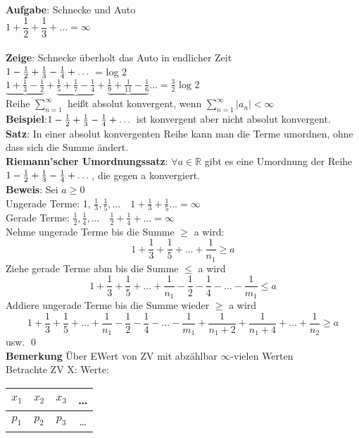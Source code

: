 \textbf{Aufgabe}: Schnecke und Auto\\
$1+\dfrac{1}{2}+\dfrac{1}{3}+\dots = \infty$\medskip\\
\\
\textbf{Zeige}: Schnecke überholt das Auto in endlicher Zeit\\
$1-\frac{1}{2}+\frac{1}{3} - \frac{1}{4}+\dots$ = log 2\smallskip\\
$\underbrace{1+\frac{1}{3}-\frac{1}{2}}+\underbrace{\frac{1}{5}+\frac{1}{7}-\frac{1}{4}}+\underbrace{\frac{1}{9}+\frac{1}{11}-\frac{1}{6}}\dots = \frac{3}{2}\text{ log 2}$\medskip\\
Reihe $\sum_{n=1}^{\infty}$ heißt absolut konvergent, wenn $\sum_{n=1}^\infty |a_n|<\infty$\\
\textbf{Beispiel}:$1-\frac{1}{2}+\frac{1}{3} - \frac{1}{4}+\dots $ ist konvergent aber nicht absolut konvergent.\medskip\\
\textbf{Satz}: In einer absolut konvergenten Reihe kann man die Terme umordnen, ohne dass sich die Summe ändert.\\
\textbf{Riemann'scher Umordnungssatz}: $\forall a \in \mathbb{R}$ gibt es eine Umordnung der Reihe $1-\frac{1}{2}+\frac{1}{3} - \frac{1}{4}+\dots$, die gegen a konvergiert.\medskip\\
\textbf{Beweis}: Sei $a\geq 0$\\
Ungerade Terme: 1, $\frac{1}{3}, \frac{1}{5},\dots \quad 1 + \frac{1}{3}+\frac{1}{5}\dots = \infty$\medskip\\
Gerade Terme: $\frac{1}{2},\frac{1}{4},\dots \quad \frac{1}{2}+\frac{1}{4}+\dots = \infty$\medskip\\
Nehme ungerade Terme bis die Summe $\geq$ a wird: 
$$1+\dfrac{1}{3}+\dfrac{1}{5}+\dots+\frac{1}{n_1}\geq a$$
Ziehe gerade Terme abm bis die Summe $\leq$ a wird
$$1+\dfrac{1}{3}+\dfrac{1}{5}+\dots+\frac{1}{n_1}-\dfrac{1}{2}-\dfrac{1}{4}-\dots-\frac{1}{m_1}\leq a$$
Addiere ungerade Terme bis die Summe wieder $\geq$ a wird
$$1+\dfrac{1}{3}+\dfrac{1}{5}+\dots+\frac{1}{n_1}-\dfrac{1}{2}-\dfrac{1}{4}-\dots-\frac{1}{m_1}+\dfrac{1}{n_1+2}+\dfrac{1}{n_1+4}+\dots +\dfrac{1}{n_2}\geq a$$usw. \qed\medskip\\
\textbf{Bemerkung} Über EWert von ZV mit abzählbar $\infty$-vielen Werten\smallskip\\
Betrachte ZV X: \hspace{1cm} Werte: \begin{tabular}{c|c|c|c}
	$x_1$&$x_2$&$x_3$&\dots\\\hline
	$p_1$&$p_2$&$p_3$&\dots
\end{tabular}\medskip\\
